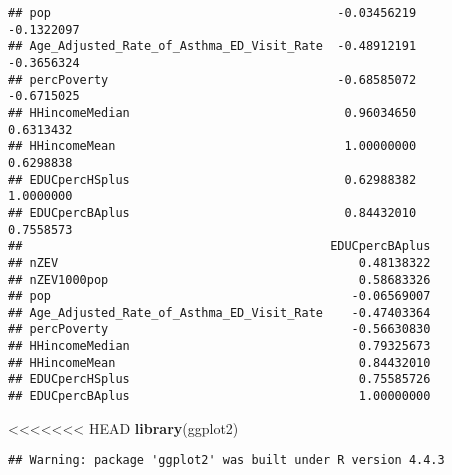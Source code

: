 \documentclass[
]{article}
\newenvironment{Shaded}{\begin{snugshade}}{\end{snugshade}}
\newcommand{\FunctionTok}[1]{\textcolor[rgb]{0.13,0.29,0.53}{\textbf{#1}}}
\newcommand{\NormalTok}[1]{#1}
\begin{document}
\begin{verbatim}
## pop                                        -0.03456219     -0.1322097
## Age_Adjusted_Rate_of_Asthma_ED_Visit_Rate  -0.48912191     -0.3656324
## percPoverty                                -0.68585072     -0.6715025
## HHincomeMedian                              0.96034650      0.6313432
## HHincomeMean                                1.00000000      0.6298838
## EDUCpercHSplus                              0.62988382      1.0000000
## EDUCpercBAplus                              0.84432010      0.7558573
##                                           EDUCpercBAplus
## nZEV                                          0.48138322
## nZEV1000pop                                   0.58683326
## pop                                          -0.06569007
## Age_Adjusted_Rate_of_Asthma_ED_Visit_Rate    -0.47403364
## percPoverty                                  -0.56630830
## HHincomeMedian                                0.79325673
## HHincomeMean                                  0.84432010
## EDUCpercHSplus                                0.75585726
## EDUCpercBAplus                                1.00000000
\end{verbatim}

\begin{Shaded}
\begin{Highlighting}[]
<<<<<<< HEAD
\FunctionTok{library}\NormalTok{(ggplot2)}
\end{Highlighting}
\end{Shaded}

\begin{verbatim}
## Warning: package 'ggplot2' was built under R version 4.4.3
\end{verbatim}
\end{document}
